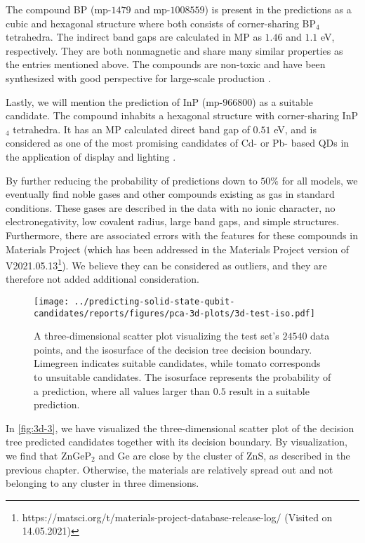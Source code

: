 The compound BP (mp-$1479$ and mp-$1008559$) is present in the predictions as a cubic and hexagonal structure where both consists of corner-sharing BP$_4$ tetrahedra. The indirect band gaps are calculated in MP as $1.46$ and $1.1$ eV, respectively. They are both nonmagnetic and share many similar properties as the entries mentioned above. The compounds are non-toxic and have been synthesized with good perspective for large-scale production \cite{MukhanovVladimirA2016Umso}.

Lastly, we will mention the prediction of InP (mp-$966800$) as a suitable candidate. The compound inhabits a hexagonal structure with corner-sharing InP$_4$ tetrahedra. It has an MP calculated direct band gap of $0.51$ eV, and is considered as one of the most promising candidates of Cd- or Pb- based QDs in the application of display and lighting \cite{Zhang2020a, Won2019}.

By further reducing the probability of predictions down to $50\%$ for all models, we eventually find noble gases and other compounds existing as gas in standard conditions. These gases are described in the data with no ionic character, no electronegativity, low covalent radius, large band gaps, and simple structures. Furthermore, there are associated errors with the features for these compounds in Materials Project (which has been addressed in the Materials Project version of V2021.05.13\footnote{https://matsci.org/t/materials-project-database-release-log/ (Visited on 14.05.2021)}). We believe they can be considered as outliers, and they are therefore not added additional consideration.


\begin{figure}[ht!]
    \centering
    \texttt{[image: ../predicting-solid-state-qubit-candidates/reports/figures/pca-3d-plots/3d-test-iso.pdf]}
    \vspace*{-130mm}
    \caption{A three-dimensional scatter plot visualizing the test set's $24540$ data points, and the isosurface of the decision tree decision boundary. Limegreen indicates suitable candidates, while tomato corresponds to unsuitable candidates. The isosurface represents the probability of a prediction, where all values larger than $0.5$ result in a suitable prediction.}
    \label{fig:3d-3}
\end{figure}
\clearpage
In \autoref{fig:3d-3}, we have visualized the three-dimensional scatter plot of the decision tree predicted candidates together with its decision boundary. By visualization, we find that ZnGeP$_2$ and Ge are close by the cluster of ZnS, as described in the previous chapter. Otherwise, the materials are relatively spread out and not belonging to any cluster in three dimensions.

